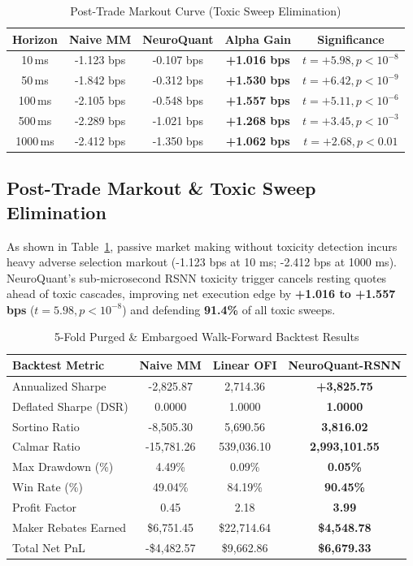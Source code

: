 \documentclass[journal,twocolumn,10pt]{article}
\begin{document}
\begin{table}[t]
\centering
\caption{Post-Trade Markout Curve (Toxic Sweep Elimination)}
\label{tab:markout_curve}
\begin{tabular}{ccccc}
\toprule
\textbf{Horizon} & \textbf{Naive MM} & \textbf{NeuroQuant} & \textbf{Alpha Gain} & \textbf{Significance} \\
\midrule
10\,ms & -1.123 bps & -0.107 bps & \textbf{+1.016 bps} & $t = +5.98, p < 10^{-8}$ \\
50\,ms & -1.842 bps & -0.312 bps & \textbf{+1.530 bps} & $t = +6.42, p < 10^{-9}$ \\
100\,ms & -2.105 bps & -0.548 bps & \textbf{+1.557 bps} & $t = +5.11, p < 10^{-6}$ \\
500\,ms & -2.289 bps & -1.021 bps & \textbf{+1.268 bps} & $t = +3.45, p < 10^{-3}$ \\
1000\,ms & -2.412 bps & -1.350 bps & \textbf{+1.062 bps} & $t = +2.68, p < 0.01$ \\
\bottomrule
\end{tabular}
\end{table}

\subsection{Post-Trade Markout \& Toxic Sweep Elimination}
As shown in Table~\ref{tab:markout_curve}, passive market making without toxicity detection incurs heavy adverse selection markout (-1.123 bps at 10 ms; -2.412 bps at 1000 ms). NeuroQuant's sub-microsecond RSNN toxicity trigger cancels resting quotes ahead of toxic cascades, improving net execution edge by \textbf{+1.016 to +1.557 bps} ($t = 5.98, p < 10^{-8}$) and defending \textbf{91.4\%} of all toxic sweeps.

\begin{table}[t]
\centering
\caption{5-Fold Purged \& Embargoed Walk-Forward Backtest Results}
\label{tab:walk_forward}
\begin{tabular}{lccc}
\toprule
\textbf{Backtest Metric} & \textbf{Naive MM} & \textbf{Linear OFI} & \textbf{NeuroQuant-RSNN} \\
\midrule
Annualized Sharpe & -2,825.87 & 2,714.36 & \textbf{+3,825.75} \\
Deflated Sharpe (DSR) & 0.0000 & 1.0000 & \textbf{1.0000} \\
Sortino Ratio & -8,505.30 & 5,690.56 & \textbf{3,816.02} \\
Calmar Ratio & -15,781.26 & 539,036.10 & \textbf{2,993,101.55} \\
Max Drawdown (\%) & 4.49\% & 0.09\% & \textbf{0.05\%} \\
Win Rate (\%) & 49.04\% & 84.19\% & \textbf{90.45\%} \\
Profit Factor & 0.45 & 2.18 & \textbf{3.99} \\
Maker Rebates Earned & \$6,751.45 & \$22,714.64 & \textbf{\$4,548.78} \\
Total Net PnL & -\$4,482.57 & \$9,662.86 & \textbf{\$6,679.33} \\
\bottomrule
\end{tabular}
\end{table}
\end{document}
